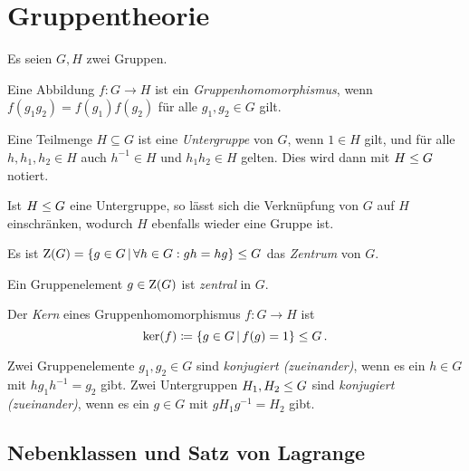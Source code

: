 \chapter{Gruppentheorie}

Es seien $G, H$ zwei Gruppen.

\begin{definition}
  Eine Abbildung $f \colon G \to H$ ist ein \emph{Gruppenhomomorphismus}, wenn $f(g_1 g_2) = f(g_1) f(g_2)$ für alle $g_1, g_2 \in G$ gilt.
\end{definition}

\begin{definition}
  Eine Teilmenge $H \subseteq G$ ist eine \emph{Untergruppe} von $G$, wenn $1 \in H$ gilt, und für alle $h, h_1, h_2 \in H$ auch $h^{-1} \in H$ und $h_1 h_2 \in H$ gelten.
  Dies wird dann mit $H \mathrel{\leq} G$ notiert.
\end{definition}

Ist $H \mathrel{\leq} G$ eine Untergruppe, so lässt sich die Verknüpfung von $G$ auf $H$ einschränken, wodurch $H$ ebenfalls wieder eine Gruppe ist.

\begin{example}
  Es ist $\groupcenter{G} = \{g \in G \suchthat \forall h \in G: gh = hg\} \subgroup G$ das \emph{Zentrum} von $G$.
\end{example}

\begin{definition}
  Ein Gruppenelement $g \in \operatorname{Z}(G)$ ist \emph{zentral} in $G$.
\end{definition}

\begin{definition}
  Der \emph{Kern} eines Gruppenhomomorphismus $f \colon G \to H$ ist
  \[
              \ker(f)
    \defined  \{
                g \in G
              \suchthat
                f(g) = 1
              \}
    \subgroup G \,.
  \]
\end{definition}

\begin{definition}
  Zwei Gruppenelemente $g_1, g_2 \in G$ sind \emph{konjugiert \textup(zueinander\textup)}, wenn es ein $h \in G$ mit $h g_1 h^{-1} = g_2$ gibt.
  Zwei Untergruppen $H_1, H_2 \mathrel{\leq} G$ sind \emph{konjugiert \textup(zueinander\textup)}, wenn es ein $g \in G$ mit $g H_1 g^{-1} = H_2$ gibt.
\end{definition}





\section{Nebenklassen und Satz von Lagrange}

